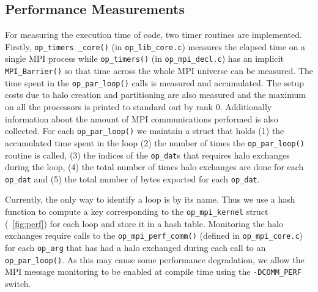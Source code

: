 \documentclass[11pt]{article}
\begin{document}
\subsection{Performance Measurements}\label{subsec/perf}

For measuring the execution time of code, two timer routines are implemented. Firstly, \texttt{op\_timers \_core()}
(in \texttt{op\_lib\_core.c}) measures the elapsed time on a single MPI process while \texttt{op\_timers()}
(in \texttt{op\_mpi\_decl.c}) has an implicit \texttt{MPI\_Barrier()} so that time across the whole MPI universe can be
measured. \noindent The time spent in the \texttt{op\_par\_loop()} calls is measured and accumulated. The setup costs
due to halo creation and partitioning are also measured and the maximum on all the processors is printed to standard out
by rank 0. Additionally information about the amount of MPI communications performed is also collected. For each
\texttt{op\_par\_loop()} we maintain a struct that holds (1) the accumulated time spent in the loop (2) the number of
times the \texttt{op\_par\_loop()} routine is called, (3) the indices of the \texttt{op\_dat}s that requires halo
exchanges during the loop, (4) the total number of times halo exchanges are done for each \texttt{op\_dat} and (5) the
total number of bytes exported for each \texttt{op\_dat}.

Currently, the only way to identify a loop is by its name. Thus we use a hash function to compute a key corresponding to
the \texttt{op\_mpi\_kernel} struct (\figurename{~\ref{fig:perf}}) for each loop and store it in a hash table.
Monitoring the halo exchanges require calls to the \texttt{op\_mpi\_perf\_comm()} (defined in \texttt{op\_mpi\_core.c})
for each \texttt{op\_arg} that has had a halo exchanged during each call to an \texttt{op\_par\_loop()}. As this may
cause some performance degradation, we allow the MPI message monitoring to be enabled at compile time using the
\texttt{-DCOMM\_PERF} switch.

\end{document}
